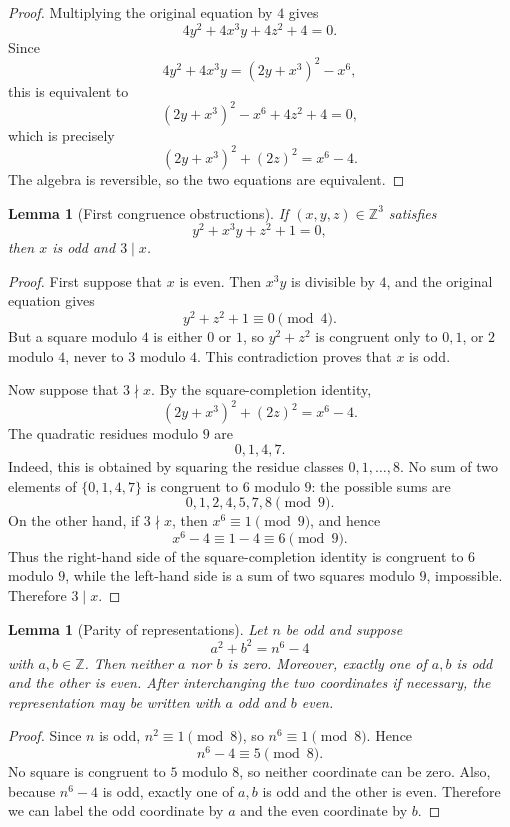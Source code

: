 \documentclass[11pt]{article}
\newtheorem{lemma}[theorem]{Lemma}
\theoremstyle{definition}
\theoremstyle{remark}
\newcommand{\Z}{\mathbb Z}
\begin{document}
\begin{proof}
Multiplying the original equation by $4$ gives
\[
        4y^2+4x^3y+4z^2+4=0.
\]
Since
\[
        4y^2+4x^3y=(2y+x^3)^2-x^6,
\]
this is equivalent to
\[
        (2y+x^3)^2-x^6+4z^2+4=0,
\]
which is precisely
\[
        (2y+x^3)^2+(2z)^2=x^6-4.
\]
The algebra is reversible, so the two equations are equivalent.
\end{proof}

\begin{lemma}[First congruence obstructions]
If $(x,y,z)\in\Z^3$ satisfies
\[
        y^2+x^3y+z^2+1=0,
\]
then $x$ is odd and $3\mid x$.
\end{lemma}

\begin{proof}
First suppose that $x$ is even.  Then $x^3y$ is divisible by $4$, and the original equation gives
\[
        y^2+z^2+1\equiv0\pmod4.
\]
But a square modulo $4$ is either $0$ or $1$, so $y^2+z^2$ is congruent only to $0,1$, or $2$ modulo $4$, never to $3$ modulo $4$.  This contradiction proves that $x$ is odd.

Now suppose that $3\nmid x$.  By the square-completion identity,
\[
        (2y+x^3)^2+(2z)^2=x^6-4.
\]
The quadratic residues modulo $9$ are
\[
        0,1,4,7.
\]
Indeed, this is obtained by squaring the residue classes $0,1,\ldots,8$.  No sum of two elements of $\{0,1,4,7\}$ is congruent to $6$ modulo $9$: the possible sums are
\[
        0,1,2,4,5,7,8 \pmod9.
\]
On the other hand, if $3\nmid x$, then $x^6\equiv1\pmod9$, and hence
\[
        x^6-4\equiv1-4\equiv6\pmod9.
\]
Thus the right-hand side of the square-completion identity is congruent to $6$ modulo $9$, while the left-hand side is a sum of two squares modulo $9$, impossible.  Therefore $3\mid x$.
\end{proof}

\begin{lemma}[Parity of representations]
Let $n$ be odd and suppose
\[
        a^2+b^2=n^6-4
\]
with $a,b\in\Z$.  Then neither $a$ nor $b$ is zero.  Moreover, exactly one of $a,b$ is odd and the other is even.  After interchanging the two coordinates if necessary, the representation may be written with $a$ odd and $b$ even.
\end{lemma}

\begin{proof}
Since $n$ is odd, $n^2\equiv1\pmod8$, so $n^6\equiv1\pmod8$.  Hence
\[
        n^6-4\equiv5\pmod8.
\]
No square is congruent to $5$ modulo $8$, so neither coordinate can be zero.  Also, because $n^6-4$ is odd, exactly one of $a,b$ is odd and the other is even.  Therefore we can label the odd coordinate by $a$ and the even coordinate by $b$.
\end{proof}
\end{document}
